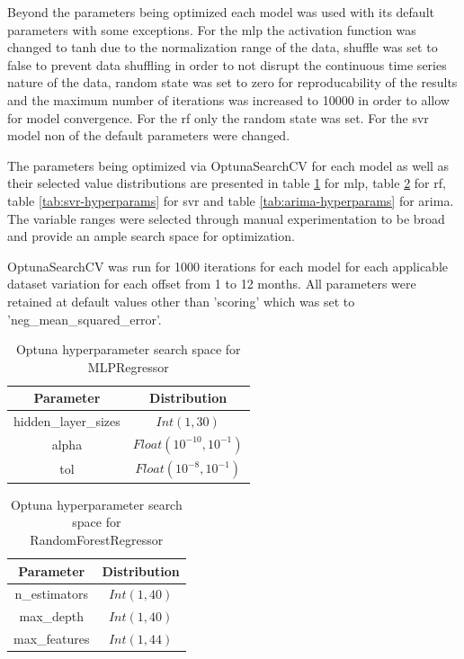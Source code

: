 Beyond the parameters being optimized each model was used with its default parameters with some exceptions. For the \gls{mlp} the activation function was changed to \gls{tanh} due to the normalization range of the data, shuffle was set to false to prevent data shuffling in order to not disrupt the continuous time series nature of the data, random state was set to zero for reproducability of the results and the maximum number of iterations was increased to 10000 in order to allow for model convergence. For the \gls{rf} only the random state was set. For the \gls{svr} model non of the default parameters were changed.

The parameters being optimized via OptunaSearchCV for each model as well as their selected value distributions are presented in table \ref{tab:mlp-hyperparams} for \gls{mlp}, table \ref{tab:rf-hyperparams} for \gls{rf}, table \ref{tab:svr-hyperparams} for \gls{svr} and table \ref{tab:arima-hyperparams} for \gls{arima}. The variable ranges were selected through manual experimentation to be broad and provide an ample search space for optimization.

OptunaSearchCV was run for 1000 iterations for each model for each applicable dataset variation for each offset from 1 to 12 months. All parameters were retained at default values other than 'scoring' which was set to 'neg\_mean\_squared\_error'.

\begin{table}[h]
    \centering
    \caption{Optuna hyperparameter search space for MLPRegressor}
    \begin{tabular}{|c|c|}
        \hline
        \textbf{Parameter} & \textbf{Distribution} \\
        \hline
        \hline
        hidden\_layer\_sizes & $Int(1, 30)$ \\
        \hline
        alpha & $Float(10^{-10}, 10^{-1})$ \\
        \hline
        tol & $Float(10^{-8}, 10^{-1})$ \\
        \hline
    \end{tabular}
    \label{tab:mlp-hyperparams}
\end{table}

\begin{table}[h]
    \centering
    \caption{Optuna hyperparameter search space for RandomForestRegressor}
    \begin{tabular}{|c|c|}
        \hline
        \textbf{Parameter} & \textbf{Distribution} \\
        \hline
        \hline
        n\_estimators & $Int(1, 40)$ \\
        \hline
        max\_depth & $Int(1, 40)$ \\
        \hline
        max\_features & $Int(1, 44)$ \\
        \hline
    \end{tabular}
    \label{tab:rf-hyperparams}
\end{table}

